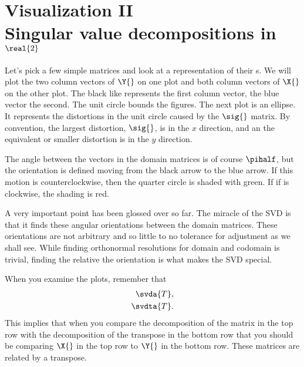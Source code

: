 \section[Visualization II: SVD]{Visualization II\\Singular value decompositions in $\real{2}$}
Let's pick a few simple matrices and look at a representation of their \svdl s. We will plot the two column vectors of $\Y{}$ on one plot and both column vectors of $\X{}$ on the other plot. The black like represents the first column vector, the blue vector the second. The unit circle bounds the figures. The next plot is an ellipse. It represents the distortions in the unit circle caused by the $\sig{}$ matrix. By convention, the largest distortion, $\sig{}$, is in the $x$ direction, and an the equivalent or smaller distortion is in the $y$ direction.

The angle between the vectors in the domain matrices is of course $\pihalf$, but the orientation is defined moving from the black arrow to the blue arrow. If this motion is counterclockwise, then the quarter circle is shaded with green. If if is clockwise, the shading is red. 

A very important point has been glossed over so far. The miracle of the SVD is that it finds these angular orientations between the domain matrices. These orientations are not arbitrary and so little to no tolerance for adjustment as we shall see. While finding orthonormal resolutions for domain and codomain is trivial, finding the relative the orientation is what makes the SVD special.

When you examine the plots, remember that
\begin{equation}
  \begin{split}
     \svda{T}, \\
     \svdta{T}.
  \end{split}
\end{equation}
This implies that when you compare the decomposition of the matrix in the top row with the decomposition of the transpose in the bottom row that you should be comparing $\X{}$ in the top row to $\Y{}$ in the bottom row. These matrices are related by a transpose.

\clearpage
\break

